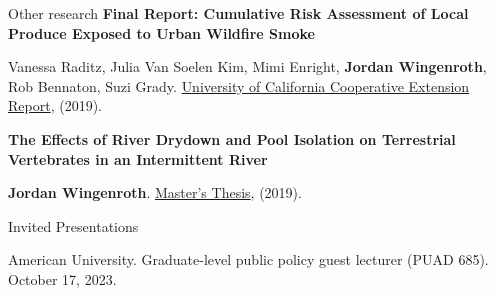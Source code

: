\documentclass{resume} %
\begin{document}
\begin{rSection}{Other research}
{\bf Final Report: Cumulative Risk Assessment of Local Produce Exposed to Urban Wildfire Smoke}
\vspace{-7pt}
\begin{adjustwidth}{12pt}{}
{\small Vanessa Raditz, Julia Van Soelen Kim, Mimi Enright, \textbf{Jordan Wingenroth}, Rob Bennaton, Suzi Grady. \href{https://ucanr.edu/sites/SoCo/files/308873.pdf}{University of California Cooperative Extension Report}, (2019).}
\end{adjustwidth}

{\bf The Effects of River Drydown and Pool Isolation on Terrestrial Vertebrates in an Intermittent River}
\vspace{-7pt}
\begin{adjustwidth}{12pt}{}
{\small \textbf{Jordan Wingenroth}. \href{https://digicoll.lib.berkeley.edu/record/140194?ln=en}{Master's Thesis}, (2019).}
\end{adjustwidth}

\end{rSection}

\begin{rSection}{Invited Presentations}

{American University. Graduate-level public policy guest lecturer (PUAD 685). October 17, 2023.}

\end{rSection}
\end{document}
